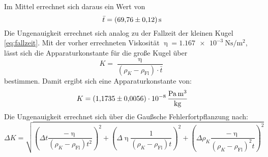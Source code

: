 \noindent
 Im Mittel errechnet sich daraus ein Wert von
 \begin{equation*}
   \bar{t} = \SI{69.76\pm0.12}{\second}
 \end{equation*}
 Die Ungenauigkeit errechnet sich analog zu der Fallzeit der kleinen Kugel \ref{eq:fallzeit}.
 Mit der vorher errechneten Viskosität $\upeta=\SI{1.167e-3}{\newton\second\per\meter\squared}$, lässt sich die Apparaturkonstante für die große Kugel über
 \begin{equation*}
   K =\frac{\upeta}{(\rho_K - \rho_\text{Fl})\cdot \bar{t}}
 \end{equation*}
 bestimmen.
 Damit ergibt sich eine Apparaturkonstante von:
 \begin{equation*}
   K=\SI{1.1735\pm 0.0056e-8}{\pascal\cubic\meter\per\kilo\gram}
 \end{equation*}
 Die Ungenauigkeit errechnet sich über die Gaußsche Fehlerfortpflanzung nach:
 \begin{equation*}
   \Delta K = \sqrt{(\Delta t \frac{- \upeta}{(\rho_K - \rho_\text{Fl})t^2})^2 +(\Delta \upeta \frac{1}{(\rho_K - \rho_\text{Fl})t})^2 + (\Delta \rho_K \frac{-\upeta}{({\rho_K} - \rho_\text{Fl})^2t})^2}
 \end{equation*}
%
